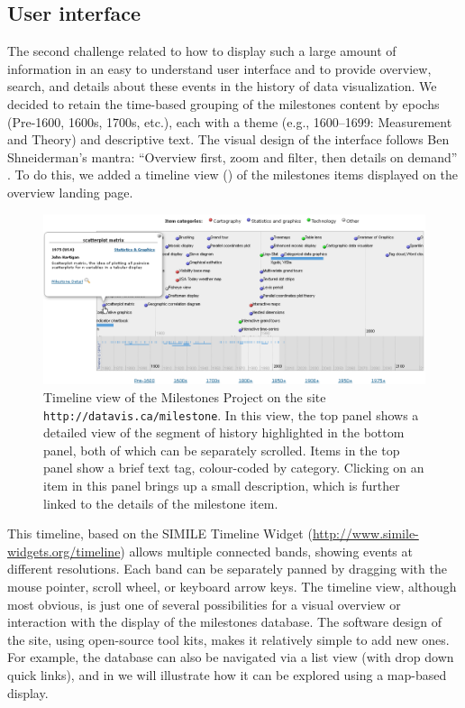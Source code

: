\subsection{User interface}
The second challenge related to how to display such a large amount of information in an easy to understand user interface and to provide overview, search, and details about these events in the history of data visualization. We decided to retain the time-based grouping of the milestones content by epochs (Pre-1600, 1600s, 1700s, etc.), each with a theme (e.g., 1600--1699: Measurement and Theory) and descriptive text. The visual design of the interface follows Ben Shneiderman's mantra: ``Overview first, zoom and filter, then details on demand'' \citep{Shneiderman:1996:IEEE}. To do this, we added a timeline view () of the milestones items displayed on the overview landing page. 

\begin{figure}[!htb]
  \centering
  \includegraphics[width=\textwidth,clip]{fig/datavis-timeline2}
  \caption{Timeline view of the Milestones Project on the site \texttt{http://datavis.ca/milestone}. In this view, the top panel shows a detailed view of the segment of history highlighted in the bottom panel, both of which can be separately scrolled. Items in the top panel show a brief text tag, colour-coded by category. Clicking on an item in this panel brings up a small description, which is further linked to the details of the milestone item.}
  \label{fig:datavis-timeline2}
\end{figure}

This timeline, based on the SIMILE Timeline Widget (\url{http://www.simile-widgets.org/timeline}) allows multiple connected bands, showing events at different resolutions.  Each band can be separately panned by dragging with the mouse pointer, scroll wheel, or keyboard arrow keys. The timeline view, although most obvious, is just one of several possibilities for a visual overview or interaction with the display of the milestones database. The software design of the site, using open-source tool kits, makes it relatively simple to add new ones.  For example, the database can also be navigated via a list view (with drop down quick links), and in  we will illustrate how it can be explored using a map-based display.
